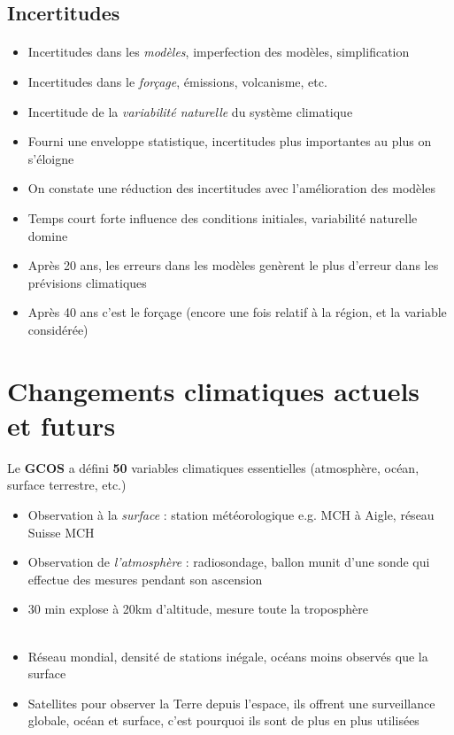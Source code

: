\documentclass {article}
\begin{document}
\subsection{Incertitudes}

\paragraph{}
\begin{itemize}
\item Incertitudes dans les \emph{modèles}, imperfection des modèles, simplification
\item Incertitudes dans le \emph{forçage}, émissions, volcanisme, etc.
\item Incertitude de la \emph{variabilité naturelle} du système climatique
\\
\item Fourni une enveloppe statistique, incertitudes plus importantes au plus on s'éloigne
\item On constate une réduction des incertitudes avec l'amélioration des modèles
\item Temps court forte influence des conditions initiales, variabilité naturelle domine
\item Après 20 ans, les erreurs dans les modèles genèrent le plus d'erreur dans les prévisions climatiques
\item Après 40 ans c'est le forçage (encore une fois relatif à la région, et la variable considérée)
\end{itemize}
\bigskip

\section{Changements climatiques actuels et futurs}

Le \textbf{GCOS} a défini \textbf{50} variables climatiques essentielles (atmosphère, océan, surface terrestre, etc.)
\\
\begin{itemize}
\item Observation à la \emph{surface} : station météorologique e.g. MCH à Aigle, réseau Suisse MCH 
\item Observation de \emph{l'atmosphère} : radiosondage, ballon munit d'une sonde qui effectue des mesures pendant son ascension
\item 30 min explose à 20km d'altitude, mesure toute la troposphère \\
\\
\item Réseau mondial, densité de stations inégale, océans moins observés que la surface
\item Satellites pour observer la Terre depuis l'espace, ils offrent une surveillance globale, océan et surface, c'est pourquoi ils sont de plus en plus utilisées
\end{itemize}
\end{document}
